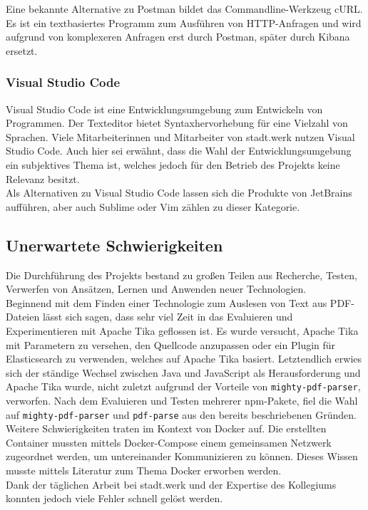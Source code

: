 \documentclass[a4paper]{scrartcl}
\begin{document}
Eine bekannte Alternative zu Postman bildet das Commandline-Werkzeug cURL. Es ist ein textbasiertes Programm zum Ausführen von HTTP-Anfragen und wird aufgrund von komplexeren Anfragen erst durch Postman, später durch Kibana ersetzt.

\subsubsection{Visual Studio Code}
Visual Studio Code ist eine Entwicklungsumgebung zum Entwickeln von Programmen. Der Texteditor bietet Syntaxhervorhebung für eine Vielzahl von Sprachen. Viele Mitarbeiterinnen und Mitarbeiter von stadt.werk nutzen Visual Studio Code. Auch hier sei erwähnt, dass die Wahl der Entwicklungsumgebung ein subjektives Thema ist, welches jedoch für den Betrieb des Projekts keine Relevanz besitzt. \\

Als Alternativen zu Visual Studio Code lassen sich die Produkte von JetBrains aufführen, aber auch Sublime oder Vim zählen zu dieser Kategorie.

\subsection{Unerwartete Schwierigkeiten}
Die Durchführung des Projekts bestand zu großen Teilen aus Recherche, Testen, Verwerfen von Ansätzen, Lernen und Anwenden neuer Technologien. \\
Beginnend mit dem Finden einer Technologie zum Auslesen von Text aus PDF-Dateien lässt sich sagen, dass sehr viel Zeit in das Evaluieren und Experimentieren mit Apache Tika geflossen ist. Es wurde versucht, Apache Tika mit Parametern zu versehen, den Quellcode anzupassen oder ein Plugin für Elasticsearch zu verwenden, welches auf Apache Tika basiert. Letztendlich erwies sich der ständige Wechsel zwischen Java und JavaScript als Herausforderung und Apache Tika wurde, nicht zuletzt aufgrund der Vorteile von \texttt{mighty-pdf-parser}, verworfen. Nach dem Evaluieren und Testen mehrerer npm-Pakete, fiel die Wahl auf \texttt{mighty-pdf-parser} und \texttt{pdf-parse} aus den bereits beschriebenen Gründen. \\
Weitere Schwierigkeiten traten im Kontext von Docker auf. Die erstellten Container mussten mittels Docker-Compose einem gemeinsamen Netzwerk zugeordnet werden, um untereinander Kommunizieren zu können. Dieses Wissen musste mittels Literatur zum Thema Docker erworben werden. \\
Dank der täglichen Arbeit bei stadt.werk und der Expertise des Kollegiums konnten jedoch viele Fehler schnell gelöst werden.
    
\end{document}
